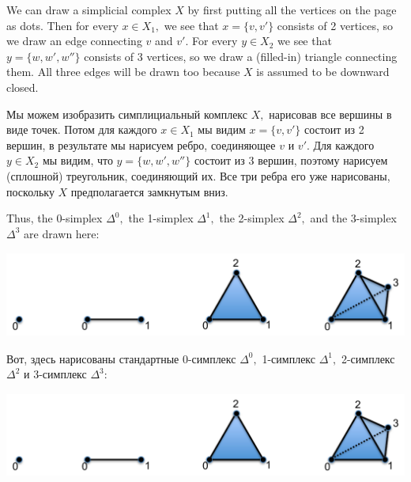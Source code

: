\documentclass[../main/CT4S-EN-RU]{subfiles}
\begin{document}
\begin{blockENG}
We can draw a simplicial complex $X$ by first putting all the vertices on the page as dots. Then for every $x\in X_1,$ we see that $x=\{v,v'\}$ consists of 2 vertices, so we draw an edge connecting $v$ and $v'.$ For every $y\in X_2$ we see that $y=\{w,w',w''\}$ consists of 3 vertices, so we draw a (filled-in) triangle connecting them. All three edges will be drawn too because $X$ is assumed to be downward closed.
\end{blockENG}

\begin{blockRUS}
Мы можем изобразить симплициальный комплекс $X,$ нарисовав все вершины в виде точек. Потом для каждого $x\in X_1$ мы видим $x=\{v,v'\}$ состоит из 2 вершин, в результате мы нарисуем ребро, соединяющее $v$ и $v'.$ Для каждого $y\in X_2$ мы видим, что $y=\{w,w',w''\}$ состоит из 3 вершин, поэтому нарисуем (сплошной) треугольник, соединяющий их. Все три ребра его уже нарисованы, поскольку $X$ предполагается замкнутым вниз.
\end{blockRUS}

\begin{blockENG}
Thus, the 0-simplex ${Δ}^0,$ the 1-simplex ${Δ}^1,$ the 2-simplex ${Δ}^2,$ and the 3-simplex ${Δ}^3$ are drawn here:
\begin{center}
\includegraphics[height=1.1in]{simplices}
\end{center} 
\end{blockENG}

\begin{blockRUS}
Вот, здесь нарисованы стандартные 0-симплекс ${Δ}^0,$ 1-симплекс ${Δ}^1,$ 2-симплекс ${Δ}^2$ и 3-симплекс ${Δ}^3$:
\begin{center}
\includegraphics[height=1.1in]{simplices}
\end{center} 
\end{blockRUS}
\end{document}
